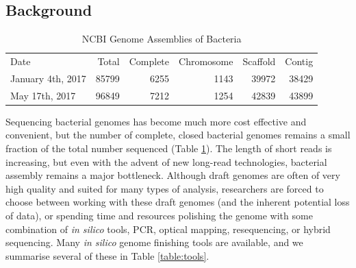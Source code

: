 \documentclass[10pt]{article}
\makeatletter
\newcommand{\ra}[1]{\renewcommand{\arraystretch}{#1}}
\newcommand{\cmidrules}[1]{%
  \noalign{%
    \global\MD@cmidrules={}%
    \toks@={\cmidrule(l{.3\tabcolsep}r{.3\tabcolsep})}%
    \count@=\z@
    \loop\ifnum\count@<#1\relax
      \advance\count@\@ne
      \edef\MD@temp{\the\toks@{\the\count@-\the\count@}}%
      \global\MD@cmidrules\expandafter{\the\expandafter\MD@cmidrules\MD@temp}%
    \repeat
  }%
  \the\MD@cmidrules
}
\makeatother
\begin{document}
\begin{linenumbers}


\section*{Background}

\begin{table}[!h]
\centering
\ra{1.3}
\caption{NCBI Genome Assemblies of Bacteria}
\label{table:completions}
\begin{tabular}{lrrrrr}
  \toprule
  Date & Total & Complete & Chromosome & Scaffold & Contig \\
  \cmidrules{6}
  January 4th, 2017 & 85799 & 6255 & 1143 & 39972 & 38429  \\
  May 17th, 2017 & 96849 & 7212 & 1254 & 42839 & 43899\\
  \bottomrule

\end{tabular}
\end{table}

Sequencing bacterial genomes has become much more cost effective and convenient, but the number of complete, closed bacterial genomes remains a small fraction of the total number sequenced (Table \ref{table:completions}). The length of short reads is increasing, but even with the advent of new long-read technologies, bacterial assembly remains a major bottleneck\cite{Nagarajan2010,Brouwer2016}. Although draft genomes are often of very high quality and suited for many types of analysis, researchers are forced to choose between working with these draft genomes (and the inherent potential loss of data), or spending time and resources polishing the genome with some combination of \textit{in silico} tools, PCR, optical mapping, resequencing, or hybrid sequencing\cite{Nagarajan2010,Utturkar2014}. Many \textit{in silico} genome finishing tools are available, and we summarise several of these in Table \ref{table:tools}.



\end{linenumbers}
\end{document}
